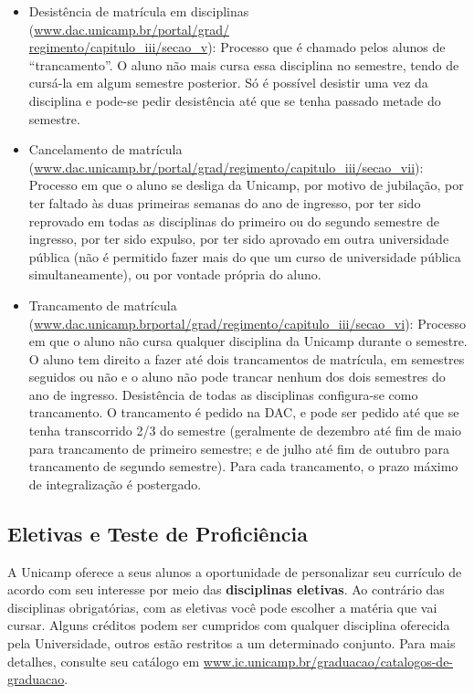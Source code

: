 \begin{itemize}
    \item Desistência de matrícula em disciplinas
        \\(\url{www.dac.unicamp.br/portal/grad/}\\\url{regimento/capitulo_iii/secao_v}):
        Processo que é chamado pelos alunos de ``trancamento''.  O aluno não
        mais cursa essa disciplina no semestre, tendo de cursá-la em algum
        semestre posterior. Só é possível desistir uma vez da disciplina e
        pode-se pedir desistência até que se tenha passado metade do semestre.
    \item Cancelamento de matrícula
        (\url{www.dac.unicamp.br/portal/grad/regimento/capitulo_iii/secao_vii}):
        Processo em que o aluno se desliga da Unicamp, por motivo de jubilação,
        por ter faltado às duas primeiras semanas do ano de ingresso, por ter
        sido reprovado em todas as disciplinas do primeiro ou do segundo
        semestre de ingresso, por ter sido expulso, por ter sido aprovado em
        outra universidade pública (não é permitido fazer mais do que um curso
        de universidade pública simultaneamente), ou por vontade própria do
        aluno.
    \item Trancamento de matrícula
        (\url{www.dac.unicamp.brportal/grad/regimento/capitulo_iii/secao_vi}):
        Processo em que o aluno não cursa qualquer disciplina da Unicamp durante
        o semestre. O aluno tem direito a fazer até dois trancamentos de
        matrícula, em semestres seguidos ou não e o aluno não pode trancar
        nenhum dos dois semestres do ano de ingresso. Desistência de todas as
        disciplinas configura-se como trancamento. O trancamento é pedido na
        DAC, e pode ser pedido até que se tenha transcorrido 2/3 do semestre
        (geralmente de dezembro até fim de maio para trancamento de primeiro
        semestre; e de julho até fim de outubro para trancamento de segundo
        semestre). Para cada trancamento, o prazo máximo de integralização é
        postergado.
\end{itemize}

\subsection{Eletivas e Teste de Proficiência}

A Unicamp oferece a seus alunos a oportunidade de personalizar seu currículo de
acordo com seu interesse por meio das \textbf{disciplinas eletivas}. Ao
contrário das disciplinas obrigatórias, com as eletivas você pode escolher a
matéria que vai cursar. Alguns créditos podem ser cumpridos com qualquer
disciplina oferecida pela Universidade, outros estão restritos a um determinado
conjunto. Para mais detalhes, consulte seu catálogo em
\url{www.ic.unicamp.br/graduacao/catalogos-de-graduacao}.

